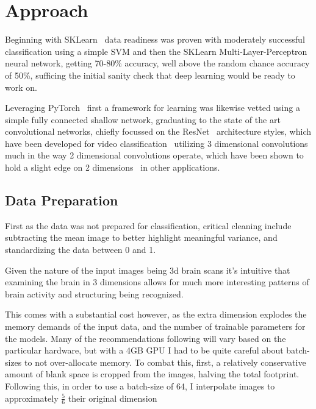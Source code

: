 \section{Approach}\label{sec:approach}

Beginning with SKLearn~\cite{scikit-learn} data readiness was proven with moderately successful classification using
a simple SVM and then the SKLearn Multi-Layer-Perceptron neural network, getting 70-80\% accuracy, well above the
random chance accuracy of 50\%, sufficing the
initial sanity check that deep learning would be ready to work on.

Leveraging PyTorch~\cite{paszke2017automatic} first a framework for learning was likewise vetted using a simple fully
connected shallow network, graduating to the state of the art convolutional networks, chiefly focussed
on the ResNet~\cite{he2016deep} architecture styles, which have been developed for video classification~\cite{tran2018closer}
utilizing 3 dimensional convolutions much in the way 2 dimensional convolutions operate, which have
been shown to hold a slight edge on 2 dimensions~\cite{payan2015predicting} in other applications.


\subsection{Data Preparation}\label{subsec:data-preparation}

First as the data was not prepared for classification, critical cleaning include subtracting the mean image to better
highlight meaningful variance, and standardizing the data between 0 and 1.

Given the nature of the input images being 3d brain scans it's intuitive that examining the brain in 3 dimensions
allows for much more interesting patterns of brain activity and structuring being recognized.

This comes with a substantial cost however, as the extra dimension explodes the memory demands of the input data, and
the number of trainable parameters for the models.
Many of the recommendations following will vary based on the particular hardware, but with a 4GB GPU I had to be quite
careful about batch-sizes to not over-allocate memory.
To combat this, first, a relatively conservative amount of blank space is cropped from the images, halving the total footprint.
Following this, in order to use a batch-size of 64, I interpolate images to approximately $\frac{5}{6}$ their original dimension

